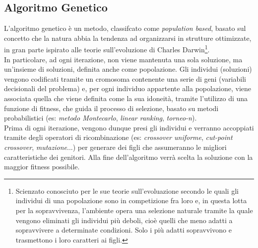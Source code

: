 \subsection{Algoritmo Genetico}
\noindent L'algoritmo genetico è un metodo, classifcato come \textit{population based}, basato sul concetto che la natura
abbia la tendenza ad organizzarsi in strutture ottimizzate, in gran parte ispirato
alle teorie sull'evoluzione di Charles Darwin\footnote[4]{Scienzato conosciuto
per le sue teorie sull'evoluazione secondo le quali gli individui di una
popolazione sono in competizione fra loro e, in questa
lotta per la sopravvivenza, l'ambiente opera una selezione naturale tramite la quale
vengono eliminati gli individui più deboli, cioè quelli
che meno adatti a sopravvivere a determinate
condizioni. Solo i più adatti sopravvivono e trasmettono i loro
caratteri ai figli.}.\\
\noindent In particolare, ad ogni iterazione, non viene mantenuta una sola soluzione, ma un'insieme di soluzioni, definita anche come popolazione.
Gli individui (soluzioni) vengono codificati tramite un cromosoma contenente una serie di geni (variabili decisionali del problema) e, per
ogni individuo appartente alla popolazione, viene associata quella che viene definita come la sua idoneità, tramite l'utilizzo di una
funzione di fitness, che guida il processo di selezione, basato su metodi probabilistici (es: \textit{metodo Montecarlo}, \textit{linear ranking}, \textit{torneo-n}).\\
Prima di ogni iterazione, vengono dunque presi gli individui e verranno accoppiati tramite degli operatori di ricombinazione
(es: \textit{crossover uniforme}, \textit{cut-point crossover}, \textit{mutazione}...)
per generare dei figli che assumeranno le migliori caratteristiche dei genitori. Alla fine dell'algoritmo verrà scelta la soluzione con la maggior fitness possibile.\\

